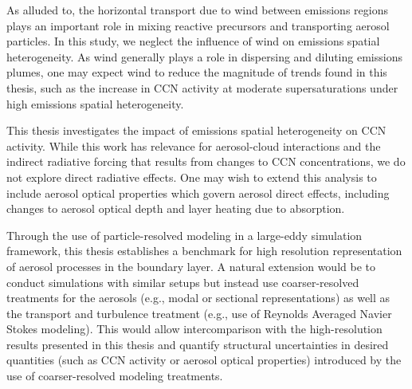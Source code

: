As alluded to, the horizontal transport due to wind between emissions regions plays an important role in mixing reactive precursors and transporting aerosol particles. In this study, we neglect the influence of wind on emissions spatial heterogeneity. As wind generally plays a role in dispersing and diluting emissions plumes, one may expect wind to reduce the magnitude of trends found in this thesis, such as the increase in CCN activity at moderate supersaturations under high emissions spatial heterogeneity.

This thesis investigates the impact of emissions spatial heterogeneity on CCN activity. While this work has relevance for aerosol-cloud interactions and the indirect radiative forcing that results from changes to CCN concentrations, we do not explore direct radiative effects. One may wish to extend this analysis to include aerosol optical properties which govern aerosol direct effects, including changes to aerosol optical depth and layer heating due to absorption.

Through the use of particle-resolved modeling in a large-eddy simulation framework, this thesis establishes a benchmark for high resolution representation of aerosol processes in the boundary layer. A natural extension would be to conduct simulations with similar setups but instead use coarser-resolved treatments for the aerosols (e.g., modal or sectional representations) as well as the transport and turbulence treatment (e.g., use of Reynolds Averaged Navier Stokes modeling). This would allow intercomparison with the high-resolution results presented in this thesis and quantify structural uncertainties in desired quantities (such as CCN activity or aerosol optical properties) introduced by the use of coarser-resolved modeling treatments.
 